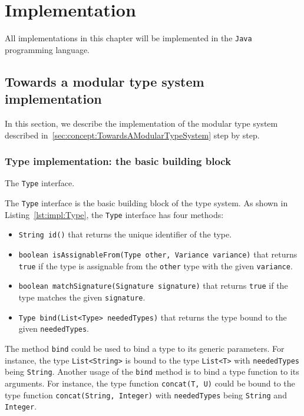 \chapter{Implementation}\label{chap:Implementation}

All implementations in this chapter will be implemented in the \texttt{Java} programming language.

\section{Towards a modular type system implementation}

In this section, we describe the implementation of the modular type system described in~\ref{sec:concept:TowardsAModularTypeSystem} step by step.

\subsection{Type implementation: the basic building block}\label{sec:impl:Type}

\begin{Listing}[tb]
    \centering
    \caption{The \texttt{Type} interface.}
    \label{lst:impl:Type}
\end{Listing}

The \texttt{Type} interface is the basic building block of the type system. As shown in Listing~\ref{lst:impl:Type}, the \texttt{Type} interface has four methods:
\begin{itemize}
    \item \texttt{String id()} that returns the unique identifier of the type.
    \item \texttt{boolean isAssignableFrom(Type other, Variance variance)} that returns \texttt{true} if the type is assignable from the \texttt{other} type with the given \texttt{variance}.
    \item \texttt{boolean matchSignature(Signature signature)} that returns \texttt{true} if the type matches the given \texttt{signature}.
    \item \texttt{Type bind(List<Type> neededTypes)} that returns the type bound to the given \texttt{neededTypes}.
\end{itemize}

The method \texttt{bind} could be used to bind a type to its generic parameters. For instance, the type \texttt{List<String>} is bound to the type \texttt{List<T>} with \texttt{neededTypes} being \texttt{String}. Another usage of the \texttt{bind} method is to bind a type function to its arguments. For instance, the type function \texttt{concat(T, U)} could be bound to the type function \texttt{concat(String, Integer)} with \texttt{neededTypes} being \texttt{String} and \texttt{Integer}.

